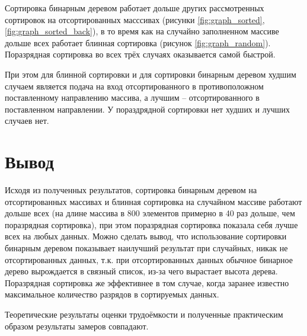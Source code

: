 \clearpage

Сортировка бинарным деревом работает дольше других рассмотренных сортировок на отсортированных масссивах (рисунки \ref{fig:graph_sorted}, \ref{fig:graph_sorted_back}), в то время как на случайно заполненном массиве дольше всех работает блинная сортировка (рисунок \ref{fig:graph_random}). Поразрядная сортировка во всех трёх случаях оказывается самой быстрой.

При этом для блинной сортировки и для сортировки бинарным деревом худшим случаем является подача на вход отсортированного в противоположном поставленному направлению массива, а лучшим -- отсортированного в поставленном направлении. У пораздрядной сортировки нет худших и лучших случаев нет.

\section*{Вывод}
Исходя из полученных результатов, сортировка бинарным деревом на отсортированных массивах и блинная сортировка на случайном массиве работают дольше всех (на длине массива в 800 элементов примерно в 40 раз дольше, чем поразрядная сортировка), при этом поразрядная сортировка показала себя лучше всех на любых данных. Можно сделать вывод, что использование сортировки бинарным деревом показывает наилучший результат при случайных, никак не отсортированных данных, т.к. при отсортированных данных обычное бинарное дерево вырождается в связный список, из-за чего вырастает высота дерева. Поразрядная сортировка же эффективнее в том случае, когда заранее известно максимальное количество разрядов в сортируемых данных.

Теоретические результаты оценки трудоёмкости и полученные практическим образом результаты замеров совпадают.